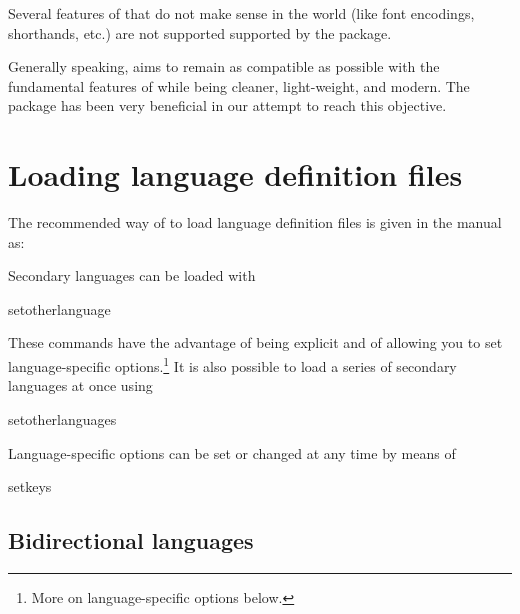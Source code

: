  Several features of  that do not make sense in the \XeTeX\/\luatex world (like font
 encodings, shorthands, etc.) are not supported supported by the package.
 
 Generally speaking,  aims to remain as compatible as possible
 with the fundamental features of  while being cleaner, light-weight,
 and modern. The package  has been very beneficial in our attempt to
 reach this objective.


\section{Loading language definition files}

The recommended way of  to load language definition files
is given in the manual as:
 
 
 Secondary languages can be loaded with

\begin{docCmd} {setotherlanguage}{}
\end{docCmd}
 These commands have the advantage of being explicit and of allowing you to set
 language-specific options.\footnote{ %
 More on language-specific options below.}
 It is also possible to load a series of secondary languages at once using

\begin{docCmd}{setotherlanguages} { }
\end{docCmd}

 Language-specific options can be set or changed at any time by means of
\begin{docCmd}{setkeys} { }
\end{docCmd}

\subsection{Bidirectional languages}





\begin{comment}
\begin{Arabic}
ّ هو إذ الغاية؛ شريف الفوائد، جم المذهب، عزيز فنّ التاريخ فنّ أنّ اعلم
والملوك سيرهم، في والأنبياء أخلاقهم، في الأمم من الماضين أحوال على يوقفنا
ّ أحوال في يرومه لمن ذلك في الإقتداء فائدة تتم حتّى وسياستهم؛ دولهم في
والدنيا. الدين
\end{Arabic}
\end{comment}

